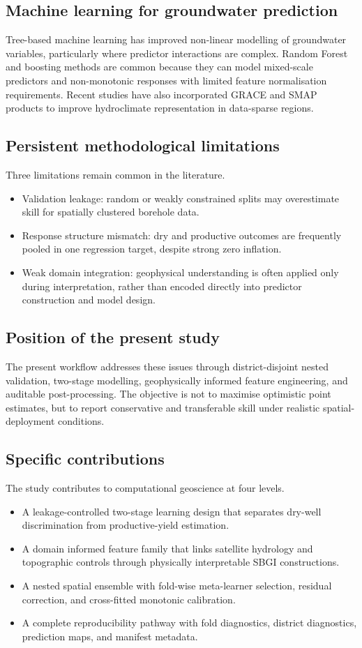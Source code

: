 \documentclass[preprint,12pt]{elsarticle}
\begin{document}
\subsection{Machine learning for groundwater prediction}
Tree-based machine learning has improved non-linear modelling of groundwater variables, particularly where predictor interactions are complex. Random Forest and boosting methods are common because they can model mixed-scale predictors and non-monotonic responses with limited feature normalisation requirements. Recent studies have also incorporated GRACE and SMAP products to improve hydroclimate representation in data-sparse regions.

\subsection{Persistent methodological limitations}
Three limitations remain common in the literature.
\begin{itemize}
\item Validation leakage: random or weakly constrained splits may overestimate skill for spatially clustered borehole data.
\item Response structure mismatch: dry and productive outcomes are frequently pooled in one regression target, despite strong zero inflation.
\item Weak domain integration: geophysical understanding is often applied only during interpretation, rather than encoded directly into predictor construction and model design.
\end{itemize}

\subsection{Position of the present study}
The present workflow addresses these issues through district-disjoint nested validation, two-stage modelling, geophysically informed feature engineering, and auditable post-processing. The objective is not to maximise optimistic point estimates, but to report conservative and transferable skill under realistic spatial-deployment conditions.

\subsection{Specific contributions}
The study contributes to computational geoscience at four levels.
\begin{itemize}
\item A leakage-controlled two-stage learning design that separates dry-well discrimination from productive-yield estimation.
\item A domain informed feature family that links satellite hydrology and topographic controls through physically interpretable SBGI constructions.
\item A nested spatial ensemble with fold-wise meta-learner selection, residual correction, and cross-fitted monotonic calibration.
\item A complete reproducibility pathway with fold diagnostics, district diagnostics, prediction maps, and manifest metadata.
\end{itemize}
\end{document}
